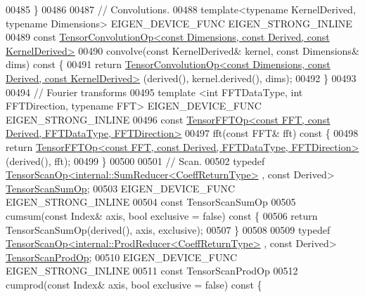 \begin{DoxyCode}
00485     \}
00486 
00487     \textcolor{comment}{// Convolutions.}
00488     \textcolor{keyword}{template}<\textcolor{keyword}{typename} KernelDerived, \textcolor{keyword}{typename} Dimensions> EIGEN\_DEVICE\_FUNC EIGEN\_STRONG\_INLINE
00489     \textcolor{keyword}{const} 
      \hyperlink{class_eigen_1_1_tensor_convolution_op}{TensorConvolutionOp<const Dimensions, const Derived, const KernelDerived>}
00490     convolve(\textcolor{keyword}{const} KernelDerived& kernel, \textcolor{keyword}{const} Dimensions& dims)\textcolor{keyword}{ const }\{
00491       \textcolor{keywordflow}{return} 
      \hyperlink{class_eigen_1_1_tensor_convolution_op}{TensorConvolutionOp<const Dimensions, const Derived, const KernelDerived>}
      (derived(), kernel.derived(), dims);
00492     \}
00493 
00494     \textcolor{comment}{// Fourier transforms}
00495     \textcolor{keyword}{template} <\textcolor{keywordtype}{int} FFTDataType, \textcolor{keywordtype}{int} FFTDirection, \textcolor{keyword}{typename} FFT> EIGEN\_DEVICE\_FUNC EIGEN\_STRONG\_INLINE
00496     \textcolor{keyword}{const} \hyperlink{class_eigen_1_1_tensor_f_f_t_op}{TensorFFTOp<const FFT, const Derived, FFTDataType, FFTDirection>}
00497     fft(\textcolor{keyword}{const} FFT& fft)\textcolor{keyword}{ const }\{
00498       \textcolor{keywordflow}{return} \hyperlink{class_eigen_1_1_tensor_f_f_t_op}{TensorFFTOp<const FFT, const Derived, FFTDataType, FFTDirection>}
      (derived(), fft);
00499     \}
00500 
00501     \textcolor{comment}{// Scan.}
00502     \textcolor{keyword}{typedef} \hyperlink{class_eigen_1_1_tensor_scan_op}{TensorScanOp<internal::SumReducer<CoeffReturnType>}
      , \textcolor{keyword}{const} Derived> \hyperlink{class_eigen_1_1_tensor_scan_op}{TensorScanSumOp};
00503     EIGEN\_DEVICE\_FUNC EIGEN\_STRONG\_INLINE
00504     \textcolor{keyword}{const} TensorScanSumOp
00505     cumsum(\textcolor{keyword}{const} Index& axis, \textcolor{keywordtype}{bool} exclusive = \textcolor{keyword}{false})\textcolor{keyword}{ const }\{
00506       \textcolor{keywordflow}{return} TensorScanSumOp(derived(), axis, exclusive);
00507     \}
00508 
00509     \textcolor{keyword}{typedef} \hyperlink{class_eigen_1_1_tensor_scan_op}{TensorScanOp<internal::ProdReducer<CoeffReturnType>}
      , \textcolor{keyword}{const} Derived> \hyperlink{class_eigen_1_1_tensor_scan_op}{TensorScanProdOp};
00510     EIGEN\_DEVICE\_FUNC EIGEN\_STRONG\_INLINE
00511     \textcolor{keyword}{const} TensorScanProdOp
00512     cumprod(\textcolor{keyword}{const} Index& axis, \textcolor{keywordtype}{bool} exclusive = \textcolor{keyword}{false})\textcolor{keyword}{ const }\{

\end{DoxyCode}

